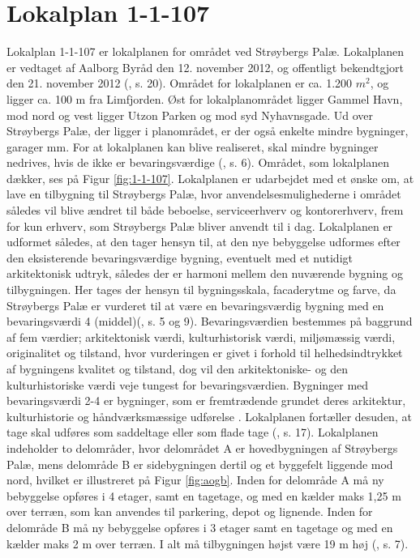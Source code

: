 \section{Lokalplan 1-1-107}
Lokalplan 1-1-107 er lokalplanen for området ved Strøybergs Palæ. Lokalplanen er vedtaget af Aalborg Byråd den 12. november 2012, og offentligt bekendtgjort den 21. november 2012 (\citep{lokalplan}, s. 20).
\newline \indent{     }  Området for lokalplanen er ca. 1.200 $m^2$, og ligger ca. 100 m fra Limfjorden. Øst for lokalplanområdet ligger Gammel Havn, mod nord og vest ligger Utzon Parken og mod syd Nyhavnsgade. Ud over Strøybergs Palæ, der ligger i planområdet, er der også enkelte mindre bygninger, garager mm. For at lokalplanen kan blive realiseret, skal mindre bygninger nedrives, hvis de ikke er bevaringsværdige (\citep{lokalplan}, s. 6). Området, som lokalplanen dækker, ses på Figur \ref{fig:1-1-107}.
\newline \indent{     }  Lokalplanen er udarbejdet med et ønske om, at lave en tilbygning til Strøybergs Palæ, hvor anvendelsesmulighederne i området således vil blive ændret til både beboelse, serviceerhverv og kontorerhverv, frem for kun erhverv, som Strøybergs Palæ bliver anvendt til i dag. Lokalplanen er udformet således, at den tager hensyn til, at den nye bebyggelse udformes efter den eksisterende bevaringsværdige bygning, eventuelt med et nutidigt arkitektonisk udtryk, således der er harmoni mellem den nuværende bygning og tilbygningen. Her tages der hensyn til bygningsskala, facaderytme og farve, da Strøybergs Palæ er vurderet til at være en bevaringsværdig bygning med en bevaringsværdi 4 (middel)(\citep{lokalplan}, s. 5 og 9). Bevaringsværdien bestemmes på baggrund af fem værdier; arkitektonisk værdi, kulturhistorisk værdi, miljømæssig værdi, originalitet og tilstand, hvor vurderingen er givet i forhold til helhedsindtrykket af bygningens kvalitet og tilstand, dog vil den arkitektoniske- og den kulturhistoriske værdi veje tungest for bevaringsværdien. Bygninger med bevaringsværdi 2-4 er bygninger, som er fremtrædende grundet deres arkitektur, kulturhistorie og håndværksmæssige udførelse \citep{bevaringsvaerdi}. Lokalplanen fortæller desuden, at tage skal udføres som saddeltage eller som flade tage (\citep{lokalplan}, s. 17).
\newline \indent{     }  Lokalplanen indeholder to delområder, hvor delområdet A er hovedbygningen af Strøybergs Palæ, mens delområde B er sidebygningen dertil og et byggefelt liggende mod nord, hvilket er illustreret på Figur \ref{fig:aogb}. Inden for delområde A må ny bebyggelse opføres i 4 etager, samt en tagetage, og med en kælder maks 1,25 m over terræn, som kan anvendes til parkering, depot og lignende. Inden for delområde B må ny bebyggelse opføres i 3 etager samt en tagetage og med en kælder maks 2 m over terræn. I alt må tilbygningen højst være 19 m høj (\citep{lokalplan}, s. 7).

